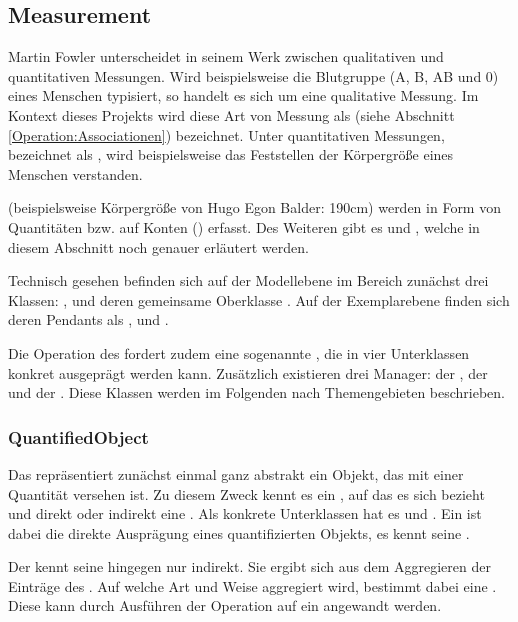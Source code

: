 \subsection{Measurement}
Martin Fowler unterscheidet in seinem Werk  zwischen qualitativen und quantitativen
Messungen. Wird beispielsweise die Blutgruppe (A, B, AB und 0) eines Menschen typisiert, so handelt es sich um
eine qualitative Messung. Im Kontext dieses Projekts wird diese Art von Messung als  (siehe Abschnitt
\ref{Operation:Associationen}) bezeichnet. Unter quantitativen Messungen, bezeichnet als , wird
beispielsweise das Feststellen der Körpergröße eines Menschen verstanden.

 (beispielsweise Körpergröße von Hugo Egon Balder: 190cm) werden in Form von Quantitäten bzw.
 auf Konten () erfasst. Des Weiteren gibt es  und
, welche in diesem Abschnitt noch genauer erläutert werden.

Technisch gesehen befinden sich auf der Modellebene im Bereich  zunächst drei Klassen:
,  und deren gemeinsame Oberklasse . Auf der
Exemplarebene finden sich deren Pendants als ,  und .

Die Operation  des  fordert zudem eine sogenannte ,
die in vier Unterklassen konkret ausgeprägt werden kann.
Zusätzlich existieren drei Manager: der , der  und der
. Diese Klassen werden im Folgenden nach Themengebieten beschrieben.


\subsubsection{QuantifiedObject}
Das  repräsentiert zunächst einmal ganz abstrakt ein Objekt, das mit einer Quantität versehen
ist. Zu diesem Zweck kennt es ein , auf das es sich bezieht und direkt oder indirekt eine .
Als konkrete Unterklassen hat es  und . Ein  ist dabei die
direkte Ausprägung eines quantifizierten Objekts, es kennt seine . 

Der  kennt seine  hingegen nur indirekt. Sie ergibt sich aus dem Aggregieren der Einträge
 des . Auf welche Art und Weise aggregiert wird, bestimmt dabei eine
. Diese kann durch Ausführen der Operation  auf ein 
angewandt werden.

